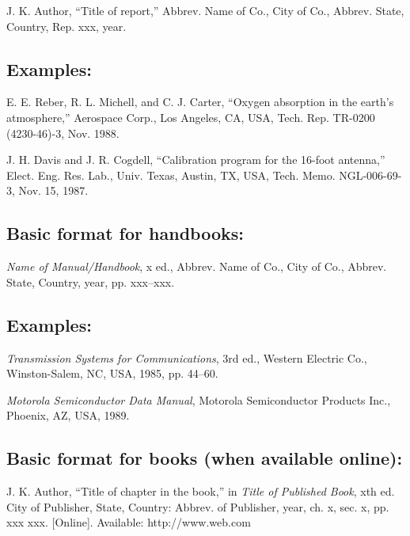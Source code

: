 J. K. Author, ``Title of report,'' Abbrev. Name of Co., City of Co., Abbrev. State, Country, Rep. xxx, year.

\subsection*{Examples:}
\begin{thebibliography}{34}
\setcounter{enumiv}{5}

\bibitem{} E. E. Reber, R. L. Michell, and C. J. Carter, ``Oxygen absorption in the earth’s atmosphere,'' Aerospace Corp., Los Angeles, CA, USA, Tech. Rep. TR-0200 (4230-46)-3, Nov. 1988.

\bibitem{} J. H. Davis and J. R. Cogdell, ``Calibration program for the 16-foot antenna,'' Elect. Eng. Res. Lab., Univ. Texas, Austin, TX, USA, Tech. Memo. NGL-006-69-3, Nov. 15, 1987.
\end{thebibliography}

\subsection*{Basic format for handbooks:}

{\em Name of Manual/Handbook}, x ed., Abbrev. Name of Co., City of Co., Abbrev. State, Country, year, pp. xxx--xxx.

\subsection*{Examples:}

\begin{thebibliography}{34}
\setcounter{enumiv}{7}

\bibitem{} {\em Transmission Systems for Communications}, 3rd ed., Western Electric Co., Winston-Salem, NC, USA, 1985, pp. 44--60.

\bibitem{} {\em Motorola Semiconductor Data Manual}, Motorola Semiconductor Products Inc., Phoenix, AZ, USA, 1989.
\end{thebibliography}

\subsection*{Basic format for books (when available online):}

J. K. Author, ``Title of chapter in the book,'' in {\em Title of Published Book}, xth ed. City of Publisher, State, Country: Abbrev. of Publisher, year, ch. x, sec. x, pp. xxx xxx. [Online]. Available: http://www.web.com 

